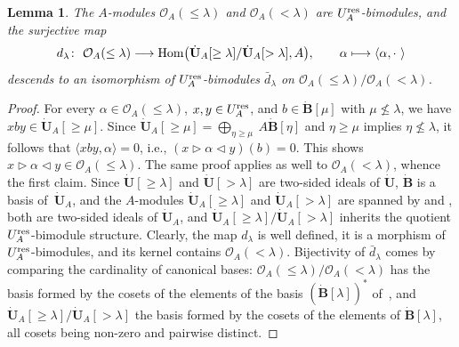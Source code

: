 \documentclass[pdftex]{sigma}
\numberwithin{equation}{section}
\newtheorem{lem}[teo]{Lemma}
\theoremstyle{definition}
\newcommand{\Oo}{{\mathcal O}}
\newcommand{\smallbullet}{%
\vcenter{\hbox{\,\scalebox{0.5}{$\bullet$}\,}}
}
\begin{document}
\begin{lem} The $A$-modules $\Oo_A(\leq \lambda)$ and $\Oo_A(< \lambda)$ are $U_A^{\rm res}$-bimodules, and the surjective map
\begin{gather}\label{dlambdamap}
d_\lambda\colon\ \Oo_A(\leq \lambda)\longrightarrow {\rm Hom}\bigl( \dot{\mathbf{U}}_A [\geq \lambda]/ \dot{\mathbf{U}}_A [> \lambda],A\bigr),\qquad \alpha\longmapsto\langle \alpha , \cdot \ \rangle
\end{gather}
descends to an isomorphism of $U_A^{\rm res}$-bimodules $\bar{d}_\lambda$ on $\Oo_A(\leq \lambda)/\Oo_A(< \lambda)$.
\end{lem}
\begin{proof} For every $\alpha\in \Oo_A(\leq \lambda)$, $x,y\in U_A^{\rm res}$, and $b\in \dot{\mathbf{B}} [\mu]$ with $\mu \nleqslant \lambda$, we have $xby \in \dot{\mathbf{U}}_A [\geq \mu]$. Since $\dot{\mathbf{U}}_A [\geq \mu]= \bigoplus_{\eta\geq \mu}\ A\dot{\mathbf{B}}[\eta]$ and $\eta\geq \mu$ implies $\eta \nleqslant \lambda$, it follows that $\langle xby, \alpha\rangle=0$, i.e., $(x\rhd \alpha \lhd y)(b)=0$. This shows $x\rhd \alpha \lhd y \in \Oo_A(\leq \lambda)$. The same proof applies as well to $\Oo_A(<\lambda)$, whence the first claim. Since $\dot{\mathbf{U}} [\geq \lambda]$ and $\dot{\mathbf{U}} [> \lambda]$ are two-sided ideals of $\dot{\mathbf{U}}$, $\dot{\mathbf{B}}$ is a basis of~$\dot{\mathbf{U}}_A$, and the $A$-modules $\dot{\mathbf{U}}_A [\geq \lambda]$ and $\dot{\mathbf{U}}_A [> \lambda]$ are spanned by  and , both are two-sided ideals of $\dot{\mathbf{U}}_A$, and $\dot{\mathbf{U}}_A [\geq \lambda]/ \dot{\mathbf{U}}_A [> \lambda]$ inherits the quotient $U_A^{\rm res}$-bimodule structure. Clearly, the map $d_\lambda$ is well defined, it is a morphism of $U_A^{\rm res}$-bimodules, and its kernel contains $\Oo_A(< \lambda)$. Bijectivity of $\bar{d}_\lambda$ comes by comparing the cardinality of canonical bases: $\Oo_A(\leq \lambda)/\Oo_A(< \lambda)$ has the basis formed by the cosets of the elements of the basis $(\dot{\mathbf{B}}[\lambda])^*$ of~\smash{${}_A \overset{\raisebox{-1.5pt}{\scriptsize$\smallbullet$}}{C} (\lambda')$}, and $\dot{\mathbf{U}}_A [\geq \lambda]/ \dot{\mathbf{U}}_A [> \lambda]$ the basis formed by the cosets of the elements of $\dot{\mathbf{B}}[\lambda]$, all cosets being non-zero and pairwise distinct.
\end{proof}
\end{document}
